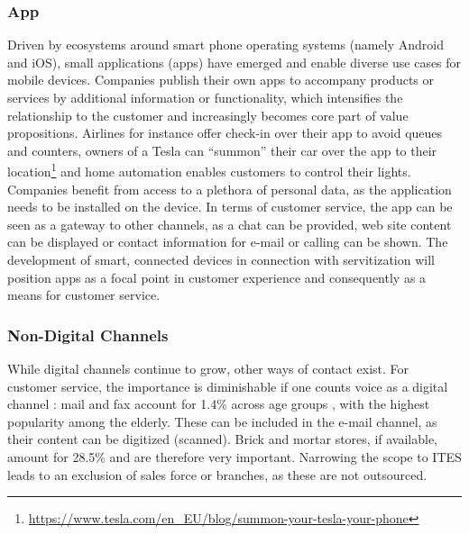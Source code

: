		\subsubsection{App}
		Driven by ecosystems around smart phone operating systems (namely Android and iOS), small applications (apps) have emerged and enable diverse use cases for mobile devices. Companies publish their own apps to accompany products or services by additional information or functionality, which intensifies the relationship to the customer and increasingly becomes core part of value propositions. Airlines for instance offer check-in over their app to avoid queues and counters, owners of a Tesla can \enquote{summon} their car over the app to their location\footnote{\cf \url{https://www.tesla.com/en_EU/blog/summon-your-tesla-your-phone} } and home automation enables customers to control their lights. Companies benefit from access to a plethora of personal data, as the application needs to be installed on the device. In terms of customer service, the app can be seen as a gateway to other channels, as a chat can be provided, web site content can be displayed or contact information for e-mail or calling can be shown. The development of smart, connected devices \citep{PorterHeppelmann15hbr} in connection with servitization \citep{servitization} will position apps as a focal point in customer experience and consequently as a means for customer service. 
		
		\subsubsection{Non-Digital Channels}
		While digital channels continue to grow, other ways of contact exist. For customer service, the importance is diminishable if one counts voice as a digital channel : mail and fax account for 1.4\% across age groups \citep{Agnischock2015}, with the highest popularity among the elderly. These can be included in the e-mail channel, as their content can be digitized (\viz scanned). Brick and mortar stores, if available, amount for 28.5\% and are therefore very important. Narrowing the scope to \acrshort{ITES} leads to an exclusion of sales force or branches, as these are not outsourced. 
		
	
